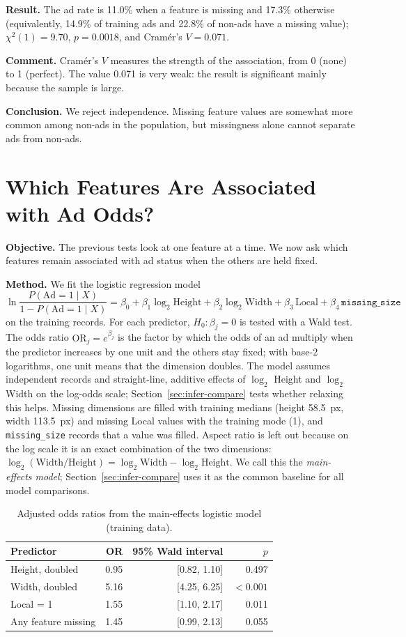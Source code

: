 \textbf{Result.} The ad rate is 11.0\% when a feature is missing and
17.3\% otherwise (equivalently, 14.9\% of training ads and 22.8\% of
non-ads have a missing value); $\chi^2(1)=9.70$, $p=0.0018$, and
Cram\'er's $V=0.071$.

\textbf{Comment.} Cram\'er's $V$ measures the strength of the association,
from 0 (none) to 1 (perfect). The value 0.071 is very weak: the result is
significant mainly because the sample is large.

\textbf{Conclusion.} We reject independence. Missing feature values are
somewhat more common among non-ads in the population, but missingness alone
cannot separate ads from non-ads.

\section{Which Features Are Associated with Ad Odds?}
\label{sec:infer-or}
\textbf{Objective.} The previous tests look at one feature at a time. We now
ask which features remain associated with ad status when the others are
held fixed.

\textbf{Method.} We fit the logistic regression model
\[
  \ln\frac{P(\mathrm{Ad}=1\mid X)}{1-P(\mathrm{Ad}=1\mid X)}
  =\beta_0+\beta_1\log_2\mathrm{Height}+\beta_2\log_2\mathrm{Width}
  +\beta_3\,\mathrm{Local}+\beta_4\,\texttt{missing\_size}
\]
on the training records. For each predictor, $H_0:\beta_j=0$ is tested with
a Wald test. The odds ratio $\mathrm{OR}_j=e^{\beta_j}$ is the factor by
which the odds of an ad multiply when the predictor increases by one unit
and the others stay fixed; with base-2 logarithms, one unit means that the
dimension doubles. The model assumes independent records and straight-line,
additive effects of $\log_2$ Height and $\log_2$ Width on the log-odds
scale; Section~\ref{sec:infer-compare} tests whether relaxing this helps.
Missing dimensions are filled with training medians (height 58.5~px, width
113.5~px) and missing Local values with the training mode (1), and
\texttt{missing\_size} records that a value was filled. Aspect ratio is
left out because on the log scale it is an exact combination of the two
dimensions: $\log_2(\mathrm{Width}/\mathrm{Height})
=\log_2\mathrm{Width}-\log_2\mathrm{Height}$. We call this the
\emph{main-effects model}; Section~\ref{sec:infer-compare} uses it as the
common baseline for all model comparisons.

\begin{table}[htbp]
\centering
\caption{Adjusted odds ratios from the main-effects logistic model (training data).}
\label{tab:infer-or}
\begin{tabular}{lrrr}
\toprule
Predictor & OR & 95\% Wald interval & $p$\\
\midrule
Height, doubled & 0.95 & [0.82, 1.10] & 0.497\\
Width, doubled & 5.16 & [4.25, 6.25] & $<0.001$\\
Local = 1 & 1.55 & [1.10, 2.17] & 0.011\\
Any feature missing & 1.45 & [0.99, 2.13] & 0.055\\
\bottomrule
\end{tabular}
\end{table}

